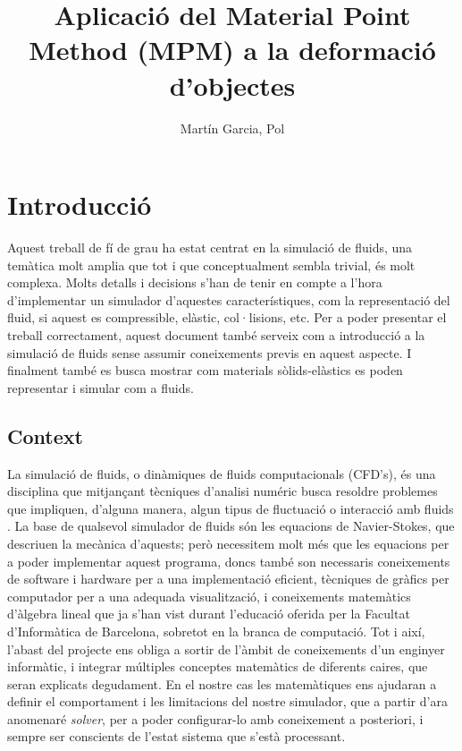 \documentclass[a4paper]{report}
\title{Aplicació del Material Point Method (MPM) a la deformació d'objectes}
\author{Martín Garcia, Pol}
\date{\parbox{\linewidth}{\centering%
		\today\endgraf\bigskip
		Director: Susín Sánchez, Toni\endgraf \medskip
		Especialitat Computació \endgraf
		Facultat d'Informàtica de Barcelona}}
\begin{document}
	\maketitle
	\newpage
	

	
	\tableofcontents
	\newpage
	
	
	\chapter{Introducció}
	Aquest treball de fí de grau ha estat centrat en la simulació de fluids, una temàtica molt amplia que tot i que conceptualment sembla trivial, és molt complexa. Molts detalls i decisions s'han de tenir en compte a l'hora d'implementar un simulador d'aquestes característiques, com la representació del fluid, si aquest es compressible, elàstic, col·lisions, etc. \newline
	Per a poder presentar el treball correctament, aquest document també serveix com a introducció a la simulació de fluids sense assumir coneixements previs en aquest aspecte.\newline
	I finalment també es busca mostrar com materials sòlids-elàstics es poden representar i simular com a fluids.\newline 

	\section{Context}
	La simulació de fluids, o dinàmiques de fluids computacionals (CFD's), és una disciplina que mitjançant tècniques d'analisi numéric busca resoldre problemes que impliquen, d'alguna manera, algun tipus de fluctuació o interacció amb fluids . \newline
	La base de qualsevol simulador de fluids són les equacions de Navier-Stokes, que descriuen la mecànica d'aquests; però necessitem molt més que les equacions per a poder implementar aquest programa, doncs també son necessaris coneixements de software i hardware per a una implementació eficient, tècniques de gràfics per computador per a una adequada visualització, i coneixements matemàtics d'àlgebra lineal que ja s'han vist durant l'educació oferida per la Facultat d'Informàtica de Barcelona, sobretot en la branca de computació. Tot i així, l'abast del projecte ens obliga a sortir de l'àmbit de coneixements d'un enginyer informàtic, i integrar múltiples conceptes matemàtics de diferents caires, que seran explicats degudament. \newline
	En el nostre cas les matemàtiques ens ajudaran a definir el comportament i les limitacions del nostre simulador, que a partir d'ara anomenaré \textit{solver}, per a poder configurar-lo amb coneixement a posteriori, i sempre ser conscients de l'estat sistema que s'està processant. \newline
	
\end{document}
